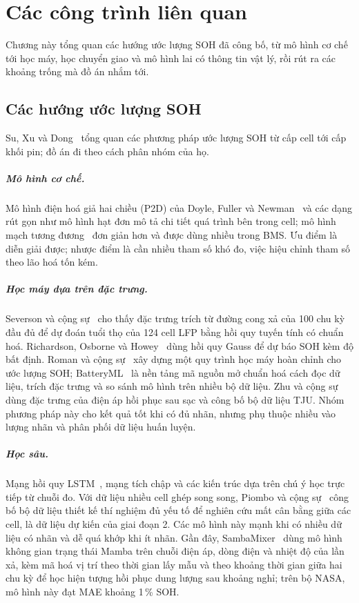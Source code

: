 \documentclass[12pt,a4paper,oneside]{report}
\theoremstyle{plain}
\theoremstyle{definition}
\begin{document}
\chapter{Các công trình liên quan}\label{ch:lienquan}

Chương này tổng quan các hướng ước lượng SOH đã công bố, từ mô hình cơ chế tới học máy, học chuyển giao và mô hình
lai có thông tin vật lý, rồi rút ra các khoảng trống mà đồ án nhắm tới.
\section{Các hướng ước lượng SOH}

Su, Xu và Dong~\cite{su2024review} tổng quan các phương pháp ước lượng SOH từ cấp cell tới cấp khối pin; đồ án đi
theo cách phân nhóm của họ.

\paragraph{Mô hình cơ chế.} Mô hình điện hoá giả hai chiều (P2D) của Doyle, Fuller và Newman~\cite{doyle1993}
và các dạng rút gọn như mô hình hạt đơn mô tả chi tiết quá trình bên trong cell; mô hình mạch tương
đương~\cite{plett2015} đơn giản hơn và được dùng nhiều trong BMS. Ưu điểm là diễn giải được; nhược điểm là
cần nhiều tham số khó đo, việc hiệu chỉnh tham số theo lão hoá tốn kém.

\paragraph{Học máy dựa trên đặc trưng.} Severson và cộng sự~\cite{severson2019} cho thấy đặc trưng trích từ
đường cong xả của 100 chu kỳ đầu đủ để dự đoán tuổi thọ của 124 cell LFP bằng hồi quy tuyến tính có chuẩn
hoá. Richardson, Osborne và Howey~\cite{richardson2017} dùng hồi quy Gauss để dự báo SOH kèm độ bất định.
Roman và cộng sự~\cite{roman2021} xây dựng một quy trình học máy hoàn chỉnh cho ước lượng SOH; BatteryML~\cite{zhang2023batteryml}
là nền tảng mã nguồn mở chuẩn hoá cách đọc dữ liệu, trích đặc trưng và so sánh mô hình trên nhiều bộ dữ liệu. Zhu và cộng
sự~\cite{zhu2022} dùng đặc trưng của điện áp hồi phục sau sạc và công bố bộ dữ liệu TJU. Nhóm phương pháp này
cho kết quả tốt khi có đủ nhãn, nhưng phụ thuộc nhiều vào lượng nhãn và phân phối dữ liệu huấn luyện.

\paragraph{Học sâu.} Mạng hồi quy LSTM~\cite{zhang2018lstm}, mạng tích chập và các kiến trúc dựa trên chú ý
học trực tiếp từ chuỗi đo. Với dữ liệu nhiều cell ghép song song, Piombo và cộng sự~\cite{piombo2024} công bố bộ dữ liệu
thiết kế thí nghiệm đủ yếu tố để nghiên cứu mất cân bằng giữa các cell, là dữ liệu dự kiến của giai đoạn 2. Các mô hình này mạnh khi có nhiều dữ liệu có nhãn và dễ quá khớp khi ít nhãn. Gần đây,
SambaMixer~\cite{olalde2024samba} dùng mô hình không gian trạng thái Mamba trên chuỗi điện áp, dòng điện và nhiệt độ
của lần xả, kèm mã hoá vị trí theo thời gian lấy mẫu và theo khoảng thời gian giữa hai chu kỳ để học hiện tượng hồi
phục dung lượng sau khoảng nghỉ; trên bộ NASA, mô hình này đạt MAE khoảng 1\,\% SOH.
\end{document}
